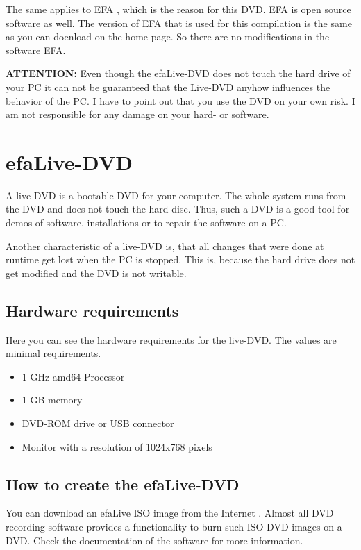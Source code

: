 \documentclass[a4paper,12pt,twoside]{article}
\begin{document}
The same applies to EFA \cite{EFA1}, which is the reason for
this DVD. EFA is open source software as well. The version of EFA that is used
for this compilation is the same as you can doenload on the home page. So there
are no modifications in the software EFA.

\bigskip
\textbf{ATTENTION:} Even though the efaLive-DVD does not touch the hard drive of your PC
it can not be guaranteed that the Live-DVD anyhow influences the
behavior of the PC. I have to point out that you use the DVD on your own
risk. I am not responsible for any damage on your hard- or software.
\bigskip

\section{efaLive-DVD}
\label{sct:efalivecd}
A live-DVD is a bootable DVD for your computer. The whole system runs from
the DVD and does not touch the hard disc. Thus, such a DVD is a good tool
for demos of software, installations or to repair the software on a PC.

Another characteristic of a live-DVD is, that all changes that were done
at runtime get lost when the PC is stopped. This is, because the hard
drive does not get modified and the DVD is not writable.

\subsection{Hardware requirements}
\label{sct:live_hardware}
Here you can see the hardware requirements for the live-DVD. The values
are minimal requirements.

\begin{itemize}
    \item 1 GHz amd64 Processor
    \item 1 GB memory
    \item DVD-ROM drive or USB connector
    \item Monitor with a resolution of 1024x768 pixels
\end{itemize}

\subsection{How to create the efaLive-DVD}
\label{sct:create_cd}
You can download an efaLive ISO image from the Internet \cite{EFA4}.
Almost all DVD recording software provides a functionality to burn such
ISO DVD images on a DVD. Check the documentation of the software for more
information.
\end{document}
